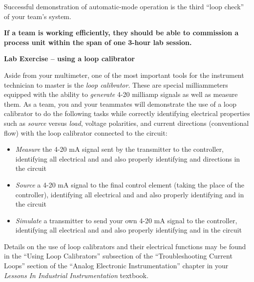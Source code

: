 Successful demonstration of automatic-mode operation is the third ``loop check'' of your team's system.

\vskip 10pt

{\bf If a team is working efficiently, they should be able to commission a process unit within the span of one 3-hour lab session.}








\vfil \eject

\noindent
{\bf Lab Exercise -- using a loop calibrator}

\vskip 5pt

Aside from your multimeter, one of the most important tools for the instrument technician to master is the {\it loop calibrator}.  These are special milliammeters equipped with the ability to {\it generate} 4-20 milliamp signals as well as measure them.  As a team, you and your teammates will demonstrate the use of a loop calibrator to do the following tasks while correctly identifying electrical properties such as {\it source} versus {\it load}, voltage polarities, and current directions (conventional flow) with the loop calibrator connected to the circuit:

\vskip 10pt

\begin{itemize}
\item{} {\it Measure} the 4-20 mA signal sent by the transmitter to the controller, identifying all electrical  and  and also properly identifying  and  directions in the circuit
\vskip 15pt 
\item{} {\it Source} a 4-20 mA signal to the final control element (taking the place of the controller), identifying all electrical  and  and also properly identifying  and  in the circuit
\vskip 15pt 
\item{} {\it Simulate} a transmitter to send your own 4-20 mA signal to the controller, identifying all electrical  and  and also properly identifying  and  in the circuit
\end{itemize}

\vskip 10pt

Details on the use of loop calibrators and their electrical functions may be found in the ``Using Loop Calibrators'' subsection of the ``Troubleshooting Current Loops'' section of the ``Analog Electronic Instrumentation'' chapter in your {\it Lessons In Industrial Instrumentation} textbook.

